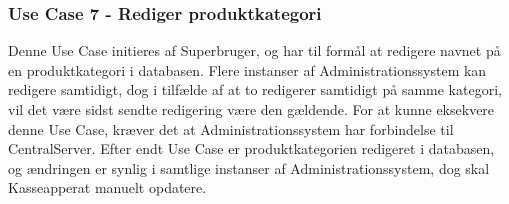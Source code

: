 \subsubsection{Use Case 7 - Rediger produktkategori}
Denne Use Case initieres af Superbruger, og har til formål at redigere navnet på en produktkategori i databasen. Flere instanser af Administrationssystem kan redigere samtidigt, dog i tilfælde af at to redigerer samtidigt på samme kategori, vil det være sidst sendte redigering være den gældende. For at kunne eksekvere denne Use Case, kræver det at Administrationssystem har forbindelse til CentralServer. Efter endt Use Case er produktkategorien redigeret i databasen, og ændringen er synlig i samtlige instanser af Administrationssystem, dog skal Kasseapperat manuelt opdatere.